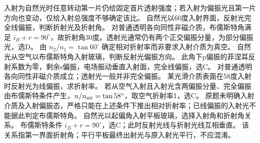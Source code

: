 \crosscheck 入射为自然光时任意转动第一片仍给固定首片透射强度；若入射为偏振光且第一片方向也变动，仅给入射总强度不够确定该比。
\problemtext 自然光以60度入射界面，反射光完全线偏振，判断折射光及折射角。
\workings 对普通透明各向同性非磁介质，布儒斯特角满足 $i_B+r=90^\circ$，故折射角30度。透射光通常仍有两个正交偏振分量，为部分偏振光，选D。
\crosscheck 由 $n_2/n_1=\tan60^\circ$ 确定相对折射率而非要求入射介质为真空。
\problemtext 自然光从空气以布儒斯特角入射玻璃，判断反射光偏振方向。
\workings 此角下p偏振的菲涅耳反射系数为零，剩余s偏振，电场振动垂直入射面，完全线偏振，选C。
\crosscheck 对普通透明各向同性非磁介质成立；透射光一般并非完全偏振。
\problemtext 某光滑介质表面在58度入射时反射光为线偏振，求折射率。
\workings 若从空气入射且入射光含两偏振分量、完全偏振由布儒斯特条件产生，$n/n_{\rm air}=\tan58^\circ$，取空气折射率1，选C。
\crosscheck 原题未明确入射介质及入射偏振态，严格只能在上述条件下推出相对折射率；已线偏振的入射光不能据此判定布儒斯特角。
\problemtext 自然光以起偏角入射平板玻璃，选择入射角和折射角关系。
\workings 布儒斯特条件 $i_B+r=90^\circ$，选C；此时反射光线与折射光线互相垂直。
\crosscheck 该关系指第一界面折射角；平行平板最终出射光与原入射光平行，不应混淆。

